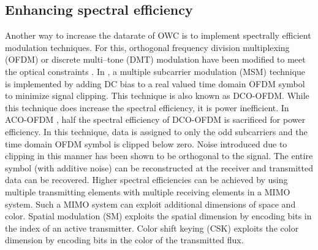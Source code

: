 \subsection{Enhancing spectral efficiency}
\label{relatedSpectral}
Another way to increase the datarate of OWC is to implement spectrally efficient modulation techniques. For this, orthogonal frequency division multiplexing (OFDM) or discrete multi--tone (DMT) modulation have been modified to meet the optical constraints \cite{vuc09a,mes10a,mes10b,dis11a}. In \cite{car96a}, a multiple subcarrier modulation (MSM) technique is implemented by adding DC bias to a real valued time domain OFDM symbol to minimize signal clipping. This technique is also known as DCO-OFDM. While this technique does increase the spectral efficiency, it is power inefficient. In ACO-OFDM \cite{arm06a}, half the spectral efficiency of DCO-OFDM is sacrificed for power efficiency. In this technique, data is assigned to only the odd subcarriers and the time domain OFDM symbol is clipped below zero. Noise introduced due to clipping in this manner has been shown to be orthogonal to the signal. The entire symbol (with additive noise) can be reconstructed at the receiver and transmitted data can be recovered. Higher spectral efficiencies can be achieved by using multiple transmitting elements with multiple receiving elements in a MIMO system. Such a MIMO system can exploit additional dimensions of space and color. Spatial modulation (SM) \cite{mes06a} exploits the spatial dimension by encoding bits in the index of an active transmitter. Color shift keying (CSK) \cite{IEEE802.15.7} exploits the color dimension by encoding bits in the color of the transmitted flux.

